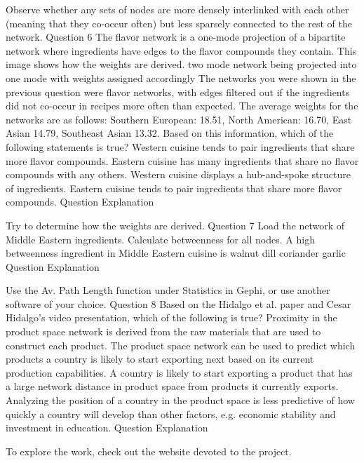 Observe whether any sets of nodes are more densely interlinked with each other (meaning that they co-occur often) but less sparsely connected to the rest of the network.
Question 6
The flavor network is a one-mode projection of a bipartite network where ingredients have edges to the flavor compounds they contain. This image shows how the weights are derived. 
two mode network being projected into one mode with weights assigned accordingly
The networks you were shown in the previous question were flavor networks, with edges filtered out if the ingredients did not co-occur in recipes more often than expected. The average weights for the networks are as follows: Southern European: 18.51, North American: 16.70, East Asian 14.79, Southeast Asian 13.32. Based on this information, which of the following statements is true?
Western cuisine tends to pair ingredients that share more flavor compounds.
Eastern cuisine has many ingredients that share no flavor compounds with any others.
Western cuisine displays a hub-and-spoke structure of ingredients.
Eastern cuisine tends to pair ingredients that share more flavor compounds.
Question Explanation

Try to determine how the weights are derived.
Question 7
Load the network of Middle Eastern ingredients. Calculate betweenness for all nodes. A high betweenness ingredient in Middle Eastern cuisine is
walnut
dill
coriander
garlic
Question Explanation

Use the Av. Path Length function under Statistics in Gephi, or use another software of your choice.
Question 8
Based on the Hidalgo et al. paper and Cesar Hidalgo's video presentation, which of the following is true?
Proximity in the product space network is derived from the raw materials that are used to construct each product.
The product space network can be used to predict which products a country is likely to start exporting next based on its current production capabilities.
A country is likely to start exporting a product that has a large network distance in product space from products it currently exports.
Analyzing the position of a country in the product space is less predictive of how quickly a country will develop than other factors, e.g. economic stability and investment in education.
Question Explanation

To explore the work, check out the website devoted to the project.

